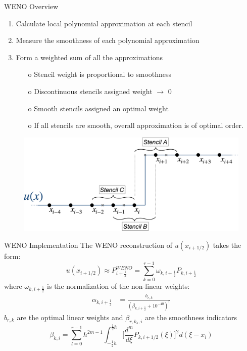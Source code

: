 \documentclass[10pt]{beamer}
\begin{document}
  \begin{frame}{WENO Overview}
    \begin{enumerate}
      \item Calculate local polynomial approximation at each stencil
      \item Measure the smoothness of each polynomial approximation
      \item Form a weighted sum of all the approximations
          \begin{itemize}
            \item[o] Stencil weight is proportional to smoothness
            \item[o] Discontinuous stencils assigned weight $\rightarrow$ 0
            \item[o] Smooth stencils assigned an optimal weight 
            \item[o] If all stencils are smooth, overall approximation is of optimal order. 
          \end{itemize}
    \end{enumerate}


    \begin{figure}[H]
      \centering
      \includegraphics[scale=0.175]{DiscontinuousStencil.png}
      \end{figure}
  \end{frame}


\begin{frame}{WENO Implementation}
  The WENO reconstruction of $u(x_{i+1/2})$ takes the form:
  \begin{equation}
    u(x_{i+1/2})\approx P^{WENO}_{i+\frac{1}{2}}=\sum_{k=0}^{r-1}\omega_{k,i+\frac{1}{2}}P_{k,i+\frac{1}{2}}\label{eq:WenoEquation}
  \end{equation}
  where $\omega_{k,i+\frac{1}{2}}$ is the normalization of the non-linear weights:
  \begin{align}
    \alpha_{k,i+\frac{1}{2}}&=\frac{b_{r,k}}{(\beta_{k,i+\frac{1}{2}} +10^{-40})^r}
  \end{align}
  $b_{r,k}$ are the optimal linear weights and 
  $\beta_{r,k_s,i}$ are the smoothness indicators
  \begin{equation}
    \beta_{k,i} = \sum_{l=0}^{r-1}h^{2m-1}\int_{-\frac{1}{2}h}^{\frac{1}{2}h}\bigg[\frac{d^m}{d\xi}P_{k,i+1/2}(\xi)\bigg]^2d(\xi-x_i)\label{eq:OptimalCoefficients}
  \end{equation}
\end{frame}
\end{document}
